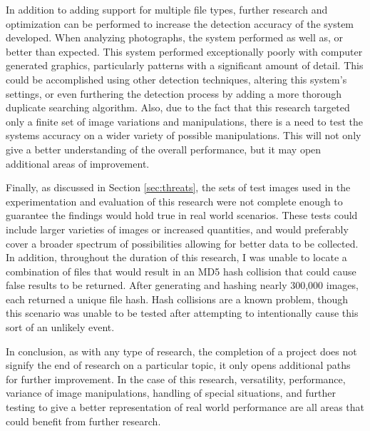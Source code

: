 In addition to adding support for multiple file types, further research and optimization can be performed to increase the detection accuracy of the system developed. When analyzing photographs, the system performed as well as, or better than expected. This system performed exceptionally poorly with computer generated graphics, particularly patterns with a significant amount of detail. This could be accomplished using other detection techniques, altering this system's settings, or even furthering the detection process by adding a more thorough duplicate searching algorithm. Also, due to the fact that this research targeted only a finite set of image variations and manipulations, there is a need to test the systems accuracy on a wider variety of possible manipulations. This will not only give a better understanding of the overall performance, but it may open additional areas of improvement.

Finally, as discussed in Section \ref{sec:threats}, the sets of test images used in the experimentation and evaluation of this research were not complete enough to guarantee the findings would hold true in real world scenarios. These tests could include larger varieties of images or increased quantities, and would preferably cover a broader spectrum of possibilities allowing for better data to be collected. In addition, throughout the duration of this research, I was unable to locate a combination of files that would result in an MD5 hash collision that could cause false results to be returned. After generating and hashing nearly 300,000 images, each returned a unique file hash. Hash collisions are a known problem, though this scenario was unable to be tested after attempting to intentionally cause this sort of an unlikely event.

In conclusion, as with any type of research, the completion of a project does not signify the end of research on a particular topic, it only opens additional paths for further improvement. In the case of this research, versatility, performance, variance of image manipulations, handling of special situations, and further testing to give a better representation of real world performance are all areas that could benefit from further research.